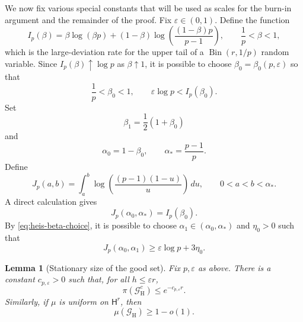 \documentclass[11pt, reqno]{amsart}
\numberwithin{equation}{section}
\newtheorem{lemma}[theorem]{Lemma}
\newcommand{\Heis}{\mathsf H}
\newcommand{\Good}{\mathcal G}
\begin{document}
We now fix various special constants that will be used as scales for the burn-in argument and the remainder of the proof. Fix \(\varepsilon\in(0,1)\).  Define the function
\[
    I_p(\beta)
    =\beta\log(\beta p)
     +(1-\beta)\log\left(\frac{(1-\beta)p}{p-1}\right),
    \qquad \frac1p<\beta<1,
\]
which is the large-deviation rate for the upper tail of a
\(\operatorname{Bin}(r,1/p)\) random variable.  Since
\(I_p(\beta)\uparrow\log p\) as \(\beta\uparrow1\), it is possible to choose
\(\beta_0=\beta_0(p,\varepsilon)\) so that
\begin{equation}\label{eq:heis-beta-choice}
    \frac1p<\beta_0<1,
    \qquad
    \varepsilon\log p<I_p(\beta_0).
\end{equation}
Set
\begin{equation}\label{eq:heis-beta0-beta1}
    \beta_1=\frac12(1+\beta_0)
\end{equation}
and
\[
    \alpha_0=1-\beta_0,
    \qquad
    \alpha_* = \frac{p-1}{p}.
\]
Define
\begin{equation}\label{eq:heis-J-rate}
    J_p(a,b)=\int_a^b \log\left(\frac{(p-1)(1-u)}{u}\right)\,du,
    \qquad 0<a<b<\alpha_*.
\end{equation}
A direct calculation gives
\begin{equation}\label{eq:heis-J-equals-I}
    J_p(\alpha_0,\alpha_*)=I_p(\beta_0).
\end{equation}
By \eqref{eq:heis-beta-choice}, it is possible to choose \(\alpha_1\in(\alpha_0,\alpha_*)\) and
\(\eta_0>0\) such that
\begin{equation}\label{eq:heis-alpha1-choice}
    J_p(\alpha_0,\alpha_1)\ge \varepsilon\log p+3\eta_0.
\end{equation}

\begin{lemma}[Stationary size of the good set]\label{lem:heis-good-stationary}
Fix $p, \varepsilon$ as above. There is a constant \(c_{p,\varepsilon}>0\) such that, for all \(h\le\varepsilon r\),
\[
    \pi(\Good_{\mathrm H}^c)\le e^{-c_{p,\varepsilon}r}.
\]
Similarly, if \(\mu\) is uniform on \(\Heis^r\), then
\[
    \mu(\Good_{\mathrm H}) \geq 1-o(1).
\]
\end{lemma}
\end{document}
